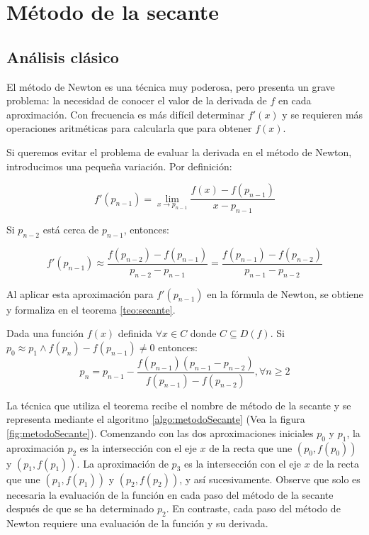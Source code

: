 \section{Método de la secante}
\subsection{Análisis clásico}

El método de Newton es una técnica muy poderosa, pero presenta un grave problema: la necesidad de conocer el valor de 
la derivada de $f$ en cada aproximación.
Con frecuencia es más difícil determinar $f'(x)$ y se requieren más operaciones aritméticas para calcularla que para 
obtener $f(x)$. 

Si queremos evitar el problema de evaluar la derivada en el método de Newton, introducimos una pequeña variación. Por definición:

\[f'(p_{n-1}) = \lim_{x\rightarrow p_{n-1}}\frac{f(x) - f(p_{n-1})}{x - p_{n-1}} \]

Si $p_{n-2}$ está cerca de $p_{n-1}$, entonces:

\[f'(p_{n-1}) \approx \frac{f(p_{n-2}) - f(p_{n-1})}{p_{n-2} - p_{n-1}} = \frac{f(p_{n-1}) - f(p_{n-2})}{p_{n-1} - p_{n-2}}\]

Al aplicar esta aproximación para $f'(p_{n-1})$ en la fórmula de Newton, se obtiene y formaliza en el teorema \ref{teo:secante}.\\

\begin{theorem}
	Dada una función $f(x)$ definida $\forall x\in C$ donde $C\subseteq D(f)$. Si $p_0\approx p_1 \wedge f(p_n)-f(p_{n-1})\not=0$ 
	entonces:
	\[p_{n} = p_{n-1} - \frac{f(p_{n-1}) (p_{n-1} - p_{n-2})}{f(p_{n-1}) - f(p_{n-2})}, \forall n\geq 2\]
	\label{teo:secante}
\end{theorem}

La técnica que utiliza el teorema recibe el nombre de método de la secante y se representa mediante el algoritmo 
\ref{algo:metodoSecante} (Vea la figura \ref{fig:metodoSecante}). Comenzando con las 
dos aproximaciones iniciales $p_{0}$ y $p_{1}$, la aproximación $p_2$ es la intersección con el eje $x$ de la recta que une 
$(p_0, f(p_0))$ y $(p_1, f(p_1))$. La aproximación de $p_3$ es la intersección con el eje $x$ de la recta que une $(p_1, f(p_1))$ 
y $(p_2, f(p_2))$, y así sucesivamente. Observe que solo es necesaria la evaluación de la función en cada paso del método de la 
secante después de que se ha determinado $p_2$. En contraste, cada paso del método de Newton requiere una evaluación de
la función y su derivada.

